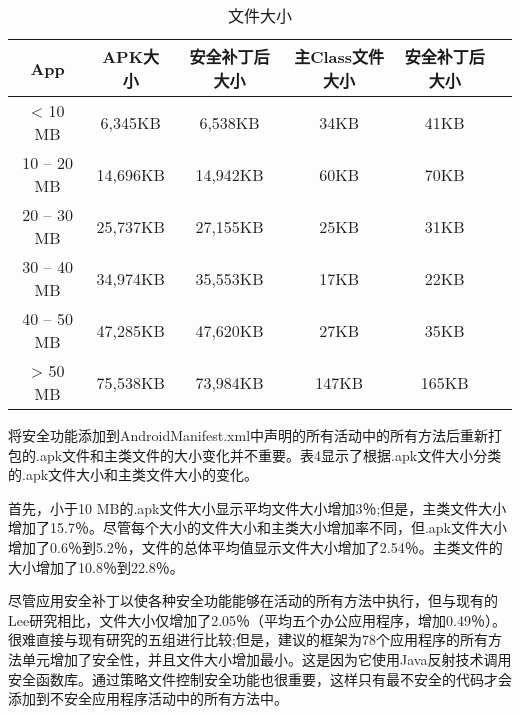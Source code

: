 		\begin{table}
			\centering
			\caption{文件大小}
			\label{tab3}
			\begin{tabular}{|c|c|c|c|c|c|}
				\hline
				App & APK大小 & 安全补丁后大小 & 主Class文件大小 & 安全补丁后大小\\
				\hline
				< 10 MB & 6,345KB & 6,538KB & 34KB & 41KB\\
				\hline
				10 – 20 MB & 14,696KB & 14,942KB & 60KB & 70KB\\
				\hline
				20 – 30 MB & 25,737KB & 27,155KB & 25KB & 31KB\\
				\hline
				30 – 40 MB & 34,974KB & 35,553KB & 17KB & 22KB\\
				\hline
				40 – 50 MB & 47,285KB & 47,620KB & 27KB & 35KB\\
				\hline
				> 50 MB & 75,538KB & 73,984KB & 147KB & 165KB\\
				\hline
			\end{tabular}
		\end{table}

		将安全功能添加到AndroidManifest.xml中声明的所有活动中的所有方法后重新打包的.apk文件和主类文件的大小变化并不重要。表4显示了根据.apk文件大小分类的.apk文件大小和主类文件大小的变化。

		首先，小于10 MB的.apk文件大小显示平均文件大小增加3％;但是，主类文件大小增加了15.7％。尽管每个大小的文件大小和主类大小增加率不同，但.apk文件大小增加了0.6％到5.2％，文件的总体平均值显示文件大小增加了2.54％。主类文件的大小增加了10.8％到22.8％。

		尽管应用安全补丁以使各种安全功能能够在活动的所有方法中执行，但与现有的Lee研究相比，文件大小仅增加了2.05％（平均五个办公应用程序，增加0.49％）。很难直接与现有研究的五组进行比较;但是，建议的框架为78个应用程序的所有方法单元增加了安全性，并且文件大小增加最小。这是因为它使用Java反射技术调用安全函数库。通过策略文件控制安全功能也很重要，这样只有最不安全的代码才会添加到不安全应用程序活动中的所有方法中。
